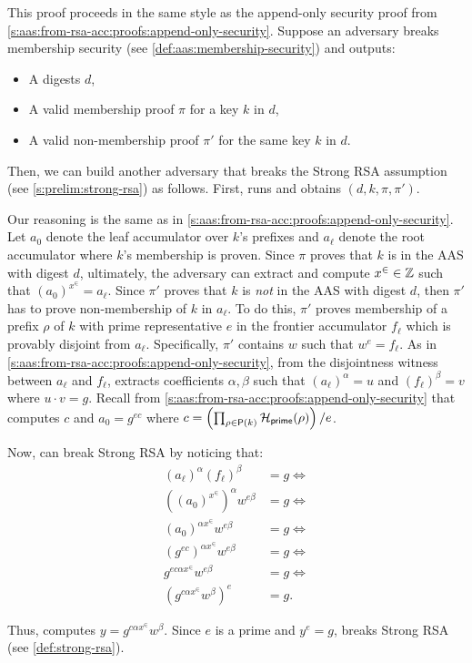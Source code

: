 This proof proceeds in the same style as the append-only security proof from \cref{s:aas:from-rsa-acc:proofs:append-only-security}.
Suppose an adversary \Adv breaks membership security (see \cref{def:aas:membership-security}) and outputs:
\begin{itemize}
\item A digests $d$,
\item A valid membership proof $\pi$ for a key $k$ in $d$,
\item A valid non-membership proof $\pi'$ for the same key $k$ in $d$.
\end{itemize}

Then, we can build another adversary \AdvB that breaks the Strong RSA assumption (see \cref{s:prelim:strong-rsa}) as follows.
First, \AdvB runs \Adv and obtains $(d,k,\pi,\pi')$.

Our reasoning is the same as in \cref{s:aas:from-rsa-acc:proofs:append-only-security}.
Let $a_0$ denote the leaf accumulator over $k$'s prefixes and $a_\ell$ denote the root accumulator where $k$'s membership is proven.
Since $\pi$ proves that $k$ is in the AAS with digest $d$, ultimately, the adversary \AdvB can extract and compute $x^{\in}\in \mathbb{Z}$ such that $\left(a_0\right)^{x^\in} = a_\ell$.
Since $\pi'$ proves that $k$ is \textit{not} in the AAS with digest $d$, then $\pi'$ has to prove non-membership of $k$ in $a_{\ell}$.
To do this, $\pi'$ proves membership of a prefix $\rho$ of $k$ with prime representative $e$ in the frontier accumulator $f_\ell$ which is provably disjoint from $a_\ell$.
Specifically, $\pi'$ contains $w$ such that $w^e = f_\ell$.
As in \cref{s:aas:from-rsa-acc:proofs:append-only-security}, from the disjointness witness between $a_\ell$ and $f_\ell$, \AdvB extracts \bezout coefficients $\alpha,\beta$ such that $(a_{\ell})^\alpha = u$ and $(f_{\ell})^\beta = v$ where $u\cdot v = g$.
Recall from \cref{s:aas:from-rsa-acc:proofs:append-only-security} that \AdvB computes $c$ and $a_0=g^{e c}$ where $c =\left(\prod_{\rho\in\mathsf{P}(k)} \mathcal{H}_{\mathsf{prime}}(\rho)\right) / e$.

Now, \AdvB can break Strong RSA by noticing that:
\begin{align*}
    \left(a_{\ell}\right)^\alpha \left(f_{\ell}\right)^\beta &= g\Leftrightarrow\\
    \left(\left(a_0\right)^{x^\in}\right)^{\alpha} w^{e\beta} &= g\Leftrightarrow\\
    \left(a_0\right)^{\alpha x^\in} w^{e\beta} &= g\Leftrightarrow\\
    \left(g^{e c}\right)^{\alpha x^\in} w^{e\beta} &= g\Leftrightarrow\\
    g^{e c \alpha x^\in} w^{e\beta} &= g\Leftrightarrow\\
    \left(g^{c \alpha x^\in} w^{\beta}\right)^e &= g.
\end{align*}

Thus, \AdvB computes $y = g^{c \alpha x^\in} w^{\beta}$.
Since $e$ is a prime and $y^e = g$, \AdvB breaks Strong RSA (see \cref{def:strong-rsa}).
